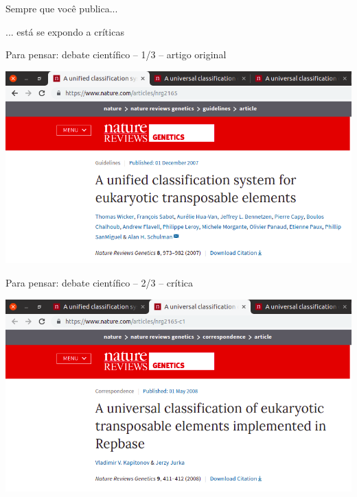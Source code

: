 \documentclass{beamer}
\begin{document}
\begin{frame}
  \begin{center}
    \Large

    Sempre que você publica...

    \bigskip
    \bigskip
    ... está se expondo a críticas
  \end{center}
\end{frame}

\begin{frame}{\tiny Para pensar: debate científico -- 1/3 -- artigo original}
  \begin{center}
    \includegraphics[width=\textwidth]{Encerramento/polemica1}
  \end{center}
\end{frame}

\begin{frame}{\tiny Para pensar: debate científico -- 2/3 -- crítica}
  \begin{center}
    \includegraphics[width=\textwidth]{Encerramento/polemica2}
  \end{center}
\end{frame}
\end{document}
